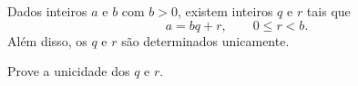 \begin{definition} 
% 
    Dados inteiros $a$ e $b$ com $b > 0$, existem inteiros $q$ e $r$ tais que 
    $$ 
        a = bq + r, \qquad 0 \leq r < b. 
    $$ 
    Além disso, os $q$ e $r$ são determinados unicamente. 
\end{definition} 
 
\begin{exercise} 
% 
    Prove a unicidade dos $q$ e $r$. 
\end{exercise} 

